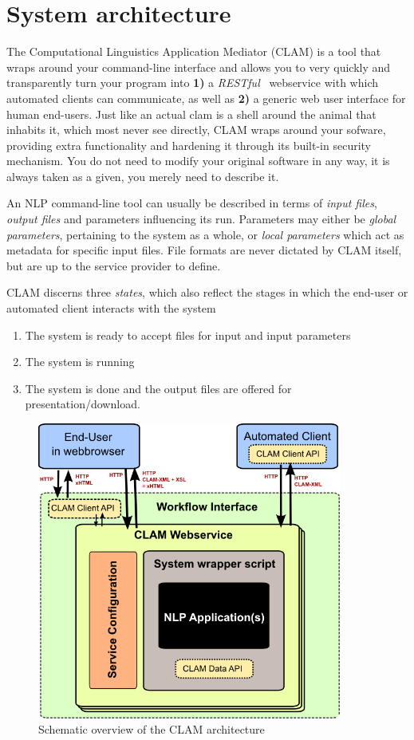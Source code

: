 \documentclass[11pt]{article}
\begin{document}
\section{System architecture}

The Computational Linguistics Application Mediator (CLAM) is a tool that wraps
around your command-line interface and allows you to very quickly and
transparently turn your program into \textbf{1)} a \emph{RESTful}~\cite{REST} webservice with which
automated clients can communicate, as well as \textbf{2)} a generic web user interface
for human end-users. Just like an actual clam is a
shell around the animal that inhabits it, which most never see
directly, CLAM wraps around your sofware, providing extra functionality and
hardening it through its built-in security mechanism. You do not need to modify
your original software in any way, it is always taken as a given, you merely
need to describe it. 

An NLP command-line tool can usually be described in terms of \emph{input
files}, \emph{output files} and parameters influencing its run. Parameters may
either be \emph{global parameters}, pertaining to the system as a whole, or
\emph{local parameters} which act as metadata for specific input files. File
formats are never dictated by CLAM itself, but are up to the service provider
to define.

CLAM discerns three \emph{states}, which also reflect the stages in which
the end-user or automated client interacts with the system

\begin{enumerate}
  \item The system is ready to accept files for input and input parameters
  \item The system is running
  \item The system is done and the output files are offered for
    presentation/download.
\end{enumerate}

\begin{figure}[htb]
\begin{center}
\includegraphics[width=100.0mm]{architecture.png}
\end{center}
\caption{Schematic overview of the CLAM architecture}
\label{fig:arch} 
\end{figure}
\end{document}
